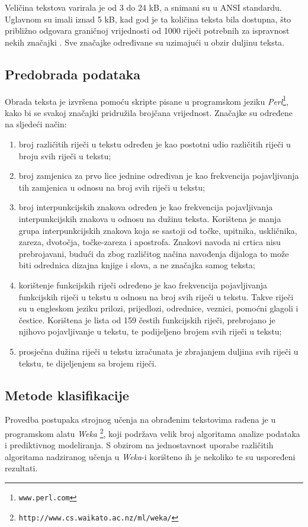 \documentclass[10pt, a4paper]{article}
\begin{document}
Veličina tekstova varirala je od 3 do 24 kB, a snimani su u ANSI standardu. Uglavnom su imali iznad 5 kB, kad god je ta količina teksta bila dostupna, što približno odgovara graničnoj vrijednosti od 1000 riječi potrebnih za ispravnost nekih značajki  \citep{tweedie}. Sve značajke određivane su uzimajući u obzir duljinu teksta. 

\subsection{Predobrada podataka}
Obrada teksta je izvršena pomoću skripte pisane u programskom jeziku \emph{Perl}\footnote{\texttt{www.perl.com}}, kako bi se svakoj značajki pridružila brojčana vrijednost. Značajke su određene na sljedeći način:
\begin{enumerate}
\item broj različitih riječi u tekstu određen je kao postotni udio različitih riječi u broju svih riječi u tekstu;
\item broj zamjenica za prvo lice jednine određivan je kao frekvencija pojavljivanja tih zamjenica u odnosu na broj svih riječi u tekstu;
\item broj interpunkcijskih znakova određen je kao frekvencija pojavljivanja interpunkcijskih znakova u odnosu na dužinu teksta. Korištena je manja grupa interpunkcijskih znakova koja se sastoji od točke, upitnika, uskličnika, zareza, dvotočja, točke-zareza i apostrofa. Znakovi navoda ni crtica nisu prebrojavani, budući da zbog različitog načina navođenja dijaloga to može biti odrednica dizajna knjige i slova, a ne značajka samog teksta;
\item korištenje funkcijskih riječi određeno je kao frekvencija pojavljivanja funkcijskih riječi u tekstu u odnosu na broj svih riječi u tekstu. Takve riječi su u engleskom jeziku prilozi, prijedlozi, odrednice, veznici, pomoćni glagoli i čestice. Korištena je lista od 159 čestih funkcijskih riječi, prebrojano je njihovo pojavljivanje u tekstu, te podijeljeno brojem svih riječi u tekstu;
\item prosječna dužina riječi u tekstu izračunata je zbrajanjem duljina svih riječi u tekstu, te dijeljenjem sa brojem riječi.
\end{enumerate}


\subsection{Metode klasifikacije}

Provedba postupaka strojnog učenja na obrađenim tekstovima rađena je u programskom alatu \emph{Weka} \footnote{\texttt{http://www.cs.waikato.ac.nz/ml/weka/}}, koji podržava velik broj algoritama analize podataka i prediktivnog modeliranja. S obzirom na jednostavnost uporabe različitih algoritama nadziranog učenja u \emph{Weka}-i korišteno ih je nekoliko te su uspoređeni rezultati.  
\end{document}
